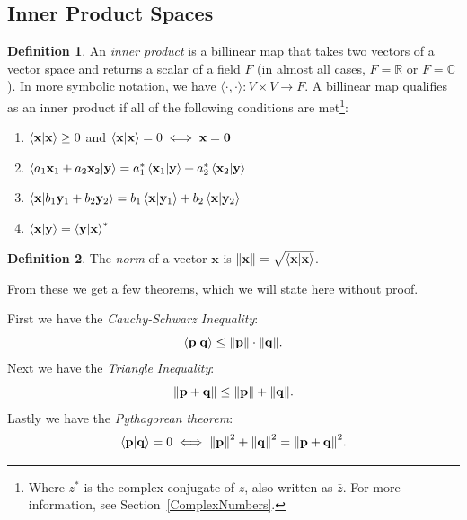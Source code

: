 \documentclass[10pt]{scrartcl}
\numberwithin{equation}{subsection}
\theoremstyle{definition}
\newtheorem{definition}{Definition}[section]
\theoremstyle{remark}
\newenvironment{definitionSR}
{
\begin{siderules}
\begin{definition}
}
{
\end{definition}
\end{siderules}
}
\newcommand{\Reals}{\mathbb{R}}
\newcommand{\Complex}{\mathbb{C}}
\newcommand{\ve}[1]{
	\mathbf{#1}
}
\begin{document}
\subsection{Inner Product Spaces}

\begin{definitionSR}
An \textit{inner product} is a billinear map that takes two vectors of a vector space and returns a scalar of a field $F$ (in almost all cases, $F=\Reals$ or $F=\Complex$).
In more symbolic notation, we have $\langle \cdot , \cdot \rangle : V \times V \to F$. A billinear map qualifies as an inner product if all of the following conditions are
met\footnote{Where $z^*$ is the complex conjugate of $z$, also written as $\bar{z}$. For more information, see Section~\ref{ComplexNumbers}.}:
\begin{enumerate}
\item $\braket{\ve{x}}{\ve{x}} \geq 0$ and $\braket{\ve{x}}{\ve{x}} = 0 \iff \ve{x} = \ve{0}$
\item $\braket{a_1\ve{x}_1 + a_2\ve{x}_2}{\ve{y}} = a_1^*\braket{\ve{x}_1}{\ve{y}} + a_2^*\braket{\ve{x}_2}{\ve{y}}$
\item $\braket{\ve{x}}{b_1\ve{y}_1 + b_2\ve{y}_2} = b_1\braket{\ve{x}}{\ve{y}_1} + b_2\braket{\ve{x}}{\ve{y}_2}$
\item $\braket{\ve{x}}{\ve{y}} = \braket{\ve{y}}{\ve{x}}^*$
\end{enumerate}

\end{definitionSR}
\begin{definitionSR}
The \textit{norm} of a vector $\ve{x}$ is $\norm{\ve{x}} = \sqrt{\braket{\ve{x}}{\ve{x}}}$.
\end{definitionSR}

From these we get a few theorems, which we will state here without proof.

First we have the \textit{Cauchy-Schwarz Inequality}:
\begin{equation}
\braket{\ve{p}}{\ve{q}} \leq \norm{\ve{p}}\cdot\norm{\ve{q}}.
\end{equation}
Next we have the \textit{Triangle Inequality}:
\begin{equation}
\norm{\ve{p} + \ve{q}} \leq \norm{\ve{p}} + \norm{\ve{q}}.
\end{equation}
Lastly we have the \textit{Pythagorean theorem}:
\begin{equation}
\braket{\ve{p}}{\ve{q}} = 0 \iff \norm{\ve{p}}^2 + \norm{\ve{q}}^2 =
\norm{\ve{p} + \ve{q}}^2.
\end{equation}
\end{document}
